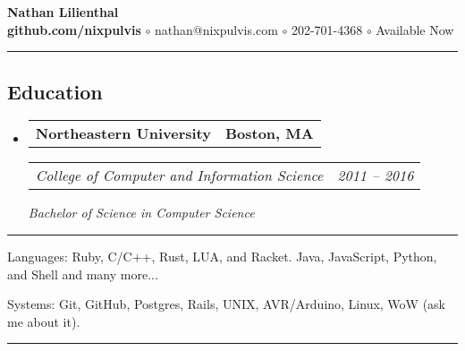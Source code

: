 \documentclass[10pt,letterpaper]{article}
\makeatletter
\newenvironment{indentsection}[1]
{\begin{list}{}
  {\setlength{\leftmargin}{#1}} \item[]
}
{\end{list}}
\newcommand{\headerrow}[2]
{\begin{tabular*}{\linewidth}{l@{\extracolsep{\fill}}r}
  #1 &
  #2 \\
\end{tabular*}}
\makeatother
\begin{document}
\begin{center}
  \huge \textbf{Nathan Lilienthal} \\
  \large
  {\bf github.com/nixpulvis}
  $\circ$
  nathan@nixpulvis.com
  $\circ$
  202-701-4368
  $\circ$
  Available Now
  \vspace{-0.2em}
\end{center}

\hrule
\vspace{-0.4em}
\subsection*{Education}
\begin{itemize}
  \parskip=0.1em

  \item
  \headerrow
    {\textbf{Northeastern University}}
    {\textbf{Boston, MA}}
  \headerrow
    {\emph{College of Computer and Information Science}}
    {\emph{2011 -- 2016}}
    {\emph{Bachelor of Science in Computer Science}}
\end{itemize}


\hrule
\begin{indentsection}{\parindent}
\begin{description*}
  \item[Languages:] Ruby, C/C++, Rust, LUA, and Racket. Java, JavaScript,
  Python, and Shell and many more...
  \item[Systems:] Git, GitHub, Postgres, Rails, UNIX, AVR/Arduino, Linux, WoW
  (ask me about it).
\end{description*}
\end{indentsection}


\hrule
\vspace{-0.4em}
\end{document}
